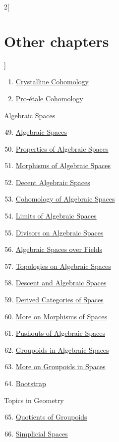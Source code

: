 \begin{multicols}{2}[\section{Other chapters}]
\begin{enumerate}
\item \hyperref[crystalline-section-phantom]{Crystalline Cohomology}
\item \hyperref[proetale-section-phantom]{Pro-\'etale Cohomology}
\end{enumerate}
Algebraic Spaces
\begin{enumerate}
\setcounter{enumi}{48}
\item \hyperref[spaces-section-phantom]{Algebraic Spaces}
\item \hyperref[spaces-properties-section-phantom]{Properties of Algebraic Spaces}
\item \hyperref[spaces-morphisms-section-phantom]{Morphisms of Algebraic Spaces}
\item \hyperref[decent-spaces-section-phantom]{Decent Algebraic Spaces}
\item \hyperref[spaces-cohomology-section-phantom]{Cohomology of Algebraic Spaces}
\item \hyperref[spaces-limits-section-phantom]{Limits of Algebraic Spaces}
\item \hyperref[spaces-divisors-section-phantom]{Divisors on Algebraic Spaces}
\item \hyperref[spaces-over-fields-section-phantom]{Algebraic Spaces over Fields}
\item \hyperref[spaces-topologies-section-phantom]{Topologies on Algebraic Spaces}
\item \hyperref[spaces-descent-section-phantom]{Descent and Algebraic Spaces}
\item \hyperref[spaces-perfect-section-phantom]{Derived Categories of Spaces}
\item \hyperref[spaces-more-morphisms-section-phantom]{More on Morphisms of Spaces}
\item \hyperref[spaces-pushouts-section-phantom]{Pushouts of Algebraic Spaces}
\item \hyperref[spaces-groupoids-section-phantom]{Groupoids in Algebraic Spaces}
\item \hyperref[spaces-more-groupoids-section-phantom]{More on Groupoids in Spaces}
\item \hyperref[bootstrap-section-phantom]{Bootstrap}
\end{enumerate}
Topics in Geometry
\begin{enumerate}
\setcounter{enumi}{64}
\item \hyperref[groupoids-quotients-section-phantom]{Quotients of Groupoids}
\item \hyperref[spaces-simplicial-section-phantom]{Simplicial Spaces}

\end{enumerate}
\end{multicols}
